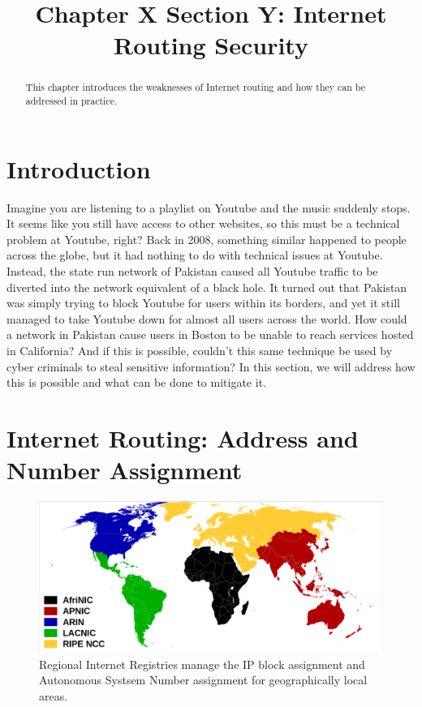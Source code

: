 \documentclass[conference]{IEEEtran}
\begin{document}
\title{Chapter X Section Y: Internet Routing Security}

\maketitle

\begin{abstract}
This chapter introduces the weaknesses of Internet routing and how they can be addressed in practice.
\end{abstract}

\section{Introduction}
Imagine you are listening to a playlist on Youtube and the music suddenly stops.  It seems like you still have access to other websites, so this must be a technical problem at Youtube, right?  Back in 2008, something similar happened to people across the globe, but it had nothing to do with technical issues at Youtube.  Instead, the state run network of Pakistan caused all Youtube traffic to be diverted into the network equivalent of a black hole.  It turned out that Pakistan was simply trying to block Youtube for users within its borders, and yet it still managed to take Youtube down for almost all users across the world.  How could a network in Pakistan cause users in Boston to be unable to reach services hosted in California?  And if this is possible, couldn't this same technique be used by cyber criminals to steal sensitive information?  In this section, we will address how this is possible and what can be done to mitigate it.

\section{Internet Routing: Address and Number Assignment}
\begin{figure}
  \includegraphics[width=\linewidth]{images/rirs.png}
  \caption{Regional Internet Registries manage the IP block assignment and Autonomous Systsem Number assignment for geographically local areas.}
  \label{fig:rirs}
\end{figure}
\end{document}
